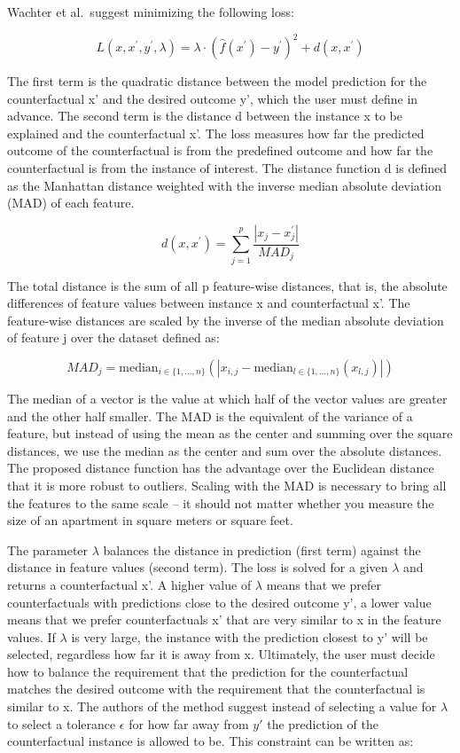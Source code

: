 \documentclass[
  11pt,
]{scrbook}
\begin{document}
Wachter et al.~suggest minimizing the following loss:

\[L(x,x^\prime,y^\prime,\lambda)=\lambda\cdot(\hat{f}(x^\prime)-y^\prime)^2+d(x,x^\prime)\]

The first term is the quadratic distance between the model prediction for the counterfactual x' and the desired outcome y', which the user must define in advance.
The second term is the distance d between the instance x to be explained and the counterfactual x'.
The loss measures how far the predicted outcome of the counterfactual is from the predefined outcome and how far the counterfactual is from the instance of interest.
The distance function d is defined as the Manhattan distance weighted with the inverse median absolute deviation (MAD) of each feature.

\[d(x,x^\prime)=\sum_{j=1}^p\frac{|x_j-x^\prime_j|}{MAD_j}\]

The total distance is the sum of all p feature-wise distances, that is, the absolute differences of feature values between instance x and counterfactual x'.
The feature-wise distances are scaled by the inverse of the median absolute deviation of feature j over the dataset defined as:

\[MAD_j=\text{median}_{i\in{}\{1,\ldots,n\}}(|x_{i,j}-\text{median}_{l\in{}\{1,\ldots,n\}}(x_{l,j})|)\]

The median of a vector is the value at which half of the vector values are greater and the other half smaller.
The MAD is the equivalent of the variance of a feature, but instead of using the mean as the center and summing over the square distances, we use the median as the center and sum over the absolute distances.
The proposed distance function has the advantage over the Euclidean distance that
it is more robust to outliers.
Scaling with the MAD is necessary to bring all the features to the same scale -- it should not matter whether you measure the size of an apartment in square meters or square feet.

The parameter \(\lambda\) balances the distance in prediction (first term) against the distance in feature values (second term).
The loss is solved for a given \(\lambda\) and returns a counterfactual x'.
A higher value of \(\lambda\) means that we prefer counterfactuals with predictions close to the desired outcome y', a lower value means that we prefer counterfactuals x' that are very similar to x in the feature values.
If \(\lambda\) is very large, the instance with the prediction closest to y' will be selected, regardless how far it is away from x.
Ultimately, the user must decide how to balance the requirement that the prediction for the counterfactual matches the desired outcome with the requirement that the counterfactual is similar to x.
The authors of the method suggest instead of selecting a value for \(\lambda\) to select a tolerance \(\epsilon\) for how far away from \(y'\) the prediction of the counterfactual instance is allowed to be.
This constraint can be written as:
\end{document}
